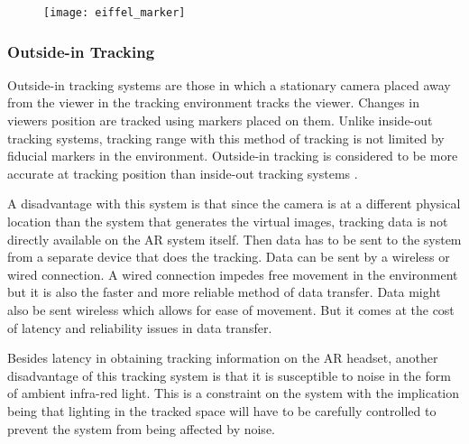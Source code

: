 \begin{figure}[linewidth]
	\centering
	\texttt{[image: eiffel\_marker]}
	\caption{}
	\label{fig:eiffel_marker}
\end{figure}

\subsubsection{Outside-in Tracking}
Outside-in tracking systems are those in which a stationary camera placed away from the viewer in the tracking environment tracks the viewer. Changes in viewers position are tracked using markers placed on them. Unlike inside-out tracking systems, tracking range with this method of tracking is not limited by fiducial markers in the environment. Outside-in tracking is considered to be more accurate at tracking position than inside-out tracking systems \parencite{klein2006visual}.

A disadvantage with this system is that since the camera is at a different physical location than the system that generates the virtual images, tracking data is not directly available on the AR system itself. Then data has to be sent to the system from a separate device that does the tracking. Data can be sent by a wireless or wired connection. A wired connection impedes free movement in the environment but it is also the faster and more reliable method of data transfer. Data might also be sent wireless which allows for ease of movement. But it comes at the cost of latency and reliability issues in data transfer. 

Besides latency in obtaining tracking information on the AR headset, another disadvantage of this tracking system is that it is susceptible to noise in the form of ambient infra-red light. This is a constraint on the system with the implication being that lighting in the tracked space will have to be carefully controlled to prevent the system from being affected by noise.
